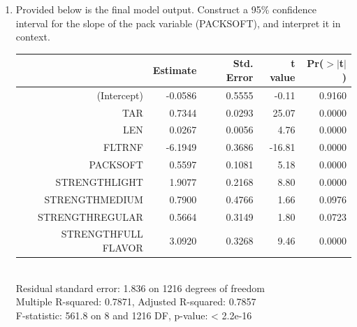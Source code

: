 \documentclass[12pt]{article}
\newcommand{\soln}[2]{$\:$\\ \vspace{#1}}{}
\begin{document}
%

\begin{enumerate}[resume]

\item Provided below is the final model output. Construct a 95\% confidence interval for the slope of 
the pack variable (PACKSOFT), and interpret it in context.

\begin{minipage}[c]{0.55\textwidth}
{\footnotesize
\begin{tabular}{rrrrr}
  \hline
 & Estimate & Std. Error & t value & Pr($>$$|$t$|$) \\ 
  \hline
(Intercept) & -0.0586 & 0.5555 & -0.11 & 0.9160 \\ 
  TAR & 0.7344 & 0.0293 & 25.07 & 0.0000 \\ 
  LEN & 0.0267 & 0.0056 & 4.76 & 0.0000 \\ 
  FLTRNF & -6.1949 & 0.3686 & -16.81 & 0.0000 \\ 
  PACKSOFT & 0.5597 & 0.1081 & 5.18 & 0.0000 \\ 
  STRENGTHLIGHT & 1.9077 & 0.2168 & 8.80 & 0.0000 \\ 
  STRENGTHMEDIUM & 0.7900 & 0.4766 & 1.66 & 0.0976 \\ 
  STRENGTHREGULAR & 0.5664 & 0.3149 & 1.80 & 0.0723 \\ 
  STRENGTHFULL FLAVOR & 3.0920 & 0.3268 & 9.46 & 0.0000 \\ 
   \hline
\end{tabular}
$\:$ \\
Residual standard error: 1.836 on 1216 degrees of freedom \\
Multiple R-squared:  0.7871,	Adjusted R-squared:  0.7857 \\
F-statistic: 561.8 on 8 and 1216 DF,  p-value: < 2.2e-16 \\
}
\end{minipage}
\begin{minipage}[c]{0.4\textwidth}
$\:$ \\
\end{minipage}

\soln{3cm}{
$df = 1216$, $t_{1216}^\star \approx 1.96$ \\
$0.5597 \pm 1.96 \times 0.1081 = (0.35, 0.77)$ \\
We are 95\% confident that, on average, soft pack cigarettes emit 0.35 mg to 0.77 mg more CO than hard pack cigarettes.
}

%

\pagebreak


\end{enumerate}
\end{document}
